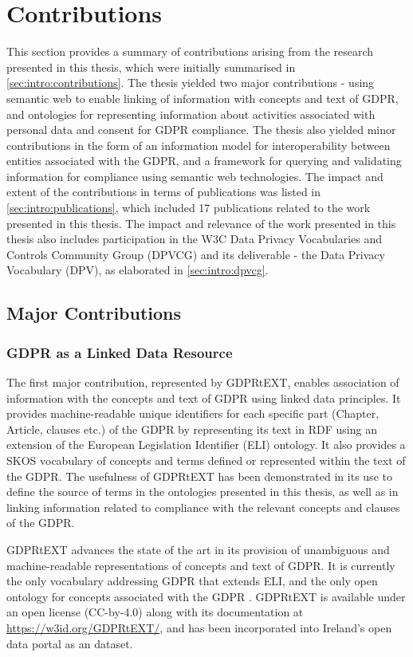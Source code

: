 \section{Contributions}\label{sec:conclusion-contributions}
This section provides a summary of contributions arising from the research presented in this thesis, which were initially summarised in \autoref{sec:intro:contributions}.
The thesis yielded two major contributions - using semantic web to enable linking of information with concepts and text of GDPR, and ontologies for representing information about activities associated with personal data and consent for GDPR compliance. The thesis also yielded minor contributions in the form of an information model for interoperability between entities associated with the GDPR, and a framework for querying and validating information for compliance using semantic web technologies.
The impact and extent of the contributions in terms of publications was listed in \autoref{sec:intro:publications}, which included 17 publications related to the work presented in this thesis.
The impact and relevance of the work presented in this thesis also includes participation in the W3C Data Privacy Vocabularies and Controls Community Group (DPVCG) and its deliverable - the Data Privacy Vocabulary (DPV), as elaborated in \autoref{sec:intro:dpvcg}.

\subsection*{Major Contributions}
\subsubsection*{GDPR as a Linked Data Resource}
The first major contribution, represented by GDPRtEXT, enables association of information with the concepts and text of GDPR using linked data principles. It provides machine-readable unique identifiers for each specific part (Chapter, Article, clauses etc.) of the GDPR by representing its text in RDF using an extension of the European Legislation Identifier (ELI) ontology. It also provides a SKOS vocabulary of concepts and terms defined or represented within the text of the GDPR. The usefulness of GDPRtEXT has been demonstrated in its use to define the source of terms in the ontologies presented in this thesis, as well as in linking information related to compliance with the relevant concepts and clauses of the GDPR.

GDPRtEXT advances the state of the art in its provision of unambiguous and machine-readable representations of concepts and text of GDPR.
It is currently the only vocabulary addressing GDPR that extends ELI, and the only open ontology for concepts associated with the GDPR \cite{leone_taking_2019}.
GDPRtEXT is available under an open license (CC-by-4.0) along with its documentation at \url{https://w3id.org/GDPRtEXT/}, and has been incorporated into Ireland's open data portal as an dataset.

